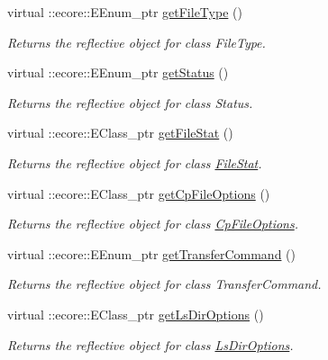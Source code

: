 \begin{DoxyCompactItemize}
\item 
virtual ::ecore::EEnum\_\-ptr \hyperlink{classFMS__Data_1_1FMS__DataPackage_adc82a830cd21c1d31f7a3e39be6ff7cf}{getFileType} ()
\begin{DoxyCompactList}\small\item\em Returns the reflective object for class FileType. \item\end{DoxyCompactList}\item 
virtual ::ecore::EEnum\_\-ptr \hyperlink{classFMS__Data_1_1FMS__DataPackage_a35bcdbf521f35a31e07cb26d1badebb3}{getStatus} ()
\begin{DoxyCompactList}\small\item\em Returns the reflective object for class Status. \item\end{DoxyCompactList}\item 
virtual ::ecore::EClass\_\-ptr \hyperlink{classFMS__Data_1_1FMS__DataPackage_a7466f94e362b67d43509ccc7a9793e89}{getFileStat} ()
\begin{DoxyCompactList}\small\item\em Returns the reflective object for class \hyperlink{classFMS__Data_1_1FileStat}{FileStat}. \item\end{DoxyCompactList}\item 
virtual ::ecore::EClass\_\-ptr \hyperlink{classFMS__Data_1_1FMS__DataPackage_a6e755422fc4d8e37f97a13b3ab5fdaca}{getCpFileOptions} ()
\begin{DoxyCompactList}\small\item\em Returns the reflective object for class \hyperlink{classFMS__Data_1_1CpFileOptions}{CpFileOptions}. \item\end{DoxyCompactList}\item 
virtual ::ecore::EEnum\_\-ptr \hyperlink{classFMS__Data_1_1FMS__DataPackage_a61ac46b04ad4c5cd45026e31a07b7232}{getTransferCommand} ()
\begin{DoxyCompactList}\small\item\em Returns the reflective object for class TransferCommand. \item\end{DoxyCompactList}\item 
virtual ::ecore::EClass\_\-ptr \hyperlink{classFMS__Data_1_1FMS__DataPackage_a9c520d5d388bfde71c5094531cd8a691}{getLsDirOptions} ()
\begin{DoxyCompactList}\small\item\em Returns the reflective object for class \hyperlink{classFMS__Data_1_1LsDirOptions}{LsDirOptions}. \item\end{DoxyCompactList}\item 

\end{DoxyCompactItemize}

